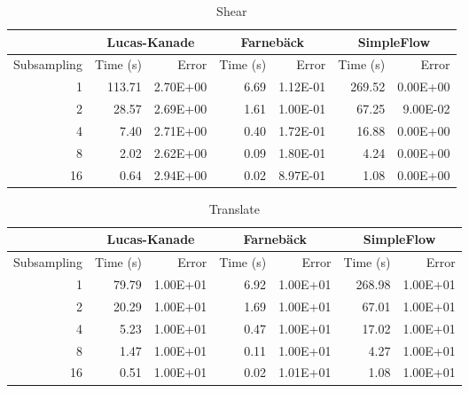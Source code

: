\begin{table}[htbp]
  \centering
  \begin{tabular}{r|rr|rr|rr}
    \toprule
    & \multicolumn{2}{c}{Lucas-Kanade} & \multicolumn{2}{c}{Farnebäck} & \multicolumn{2}{c}{SimpleFlow} \\
    \midrule
    Subsampling & Time (s) & Error & Time (s) & Error & Time (s) & Error \\
    \midrule
    1 & 113.71 & 2.70E+00 & 6.69  & 1.12E-01 & 269.52 & 0.00E+00 \\
    2 & 28.57 & 2.69E+00 & 1.61  & 1.00E-01 & 67.25 & 9.00E-02 \\
    4 & 7.40  & 2.71E+00 & 0.40  & 1.72E-01 & 16.88 & 0.00E+00 \\
    8 & 2.02  & 2.62E+00 & 0.09  & 1.80E-01 & 4.24  & 0.00E+00 \\
    16 & 0.64  & 2.94E+00 & 0.02  & 8.97E-01 & 1.08  & 0.00E+00 \\
    \bottomrule
  \end{tabular}
  \caption{Shear}
  \label{tab:shear}
\end{table}


\begin{table}[htbp]
  \centering
  \begin{tabular}{r|rr|rr|rr}
    \toprule
    & \multicolumn{2}{c}{Lucas-Kanade} & \multicolumn{2}{c}{Farnebäck} & \multicolumn{2}{c}{SimpleFlow} \\
    \midrule
    Subsampling & Time (s) & Error & Time (s) & Error & Time (s) & Error \\
    \midrule
    1 & 79.79 & 1.00E+01 & 6.92  & 1.00E+01 & 268.98 & 1.00E+01 \\
    2 & 20.29 & 1.00E+01 & 1.69  & 1.00E+01 & 67.01 & 1.00E+01 \\
    4 & 5.23  & 1.00E+01 & 0.47  & 1.00E+01 & 17.02 & 1.00E+01 \\
    8 & 1.47  & 1.00E+01 & 0.11  & 1.00E+01 & 4.27  & 1.00E+01 \\
    16 & 0.51  & 1.00E+01 & 0.02  & 1.01E+01 & 1.08  & 1.00E+01 \\
    \bottomrule
  \end{tabular}
  \caption{Translate}
  \label{tab:translate}
\end{table}
